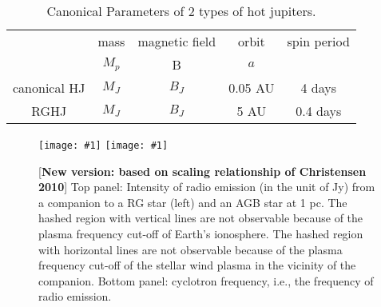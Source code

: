 \documentclass{emulateapj}
\def\memoYF#1{\color{red}$[${\bf #1}$]$ \color{black}}
\def\plotonesc#1{\centering \leavevmode
\texttt{[image: \#1]}}
\begin{document}
\begin{table}[htdp]
\caption{Canonical Parameters of 2 types of hot jupiters.}
\begin{center}
\begin{tabular}{c|cccc} \hline \hline
& mass & magnetic field & orbit &  spin period \\ 
& $M_p$ & B & $a$ &  \\ \hline
canonical HJ & $M_J$ & $B_J$ & 0.05 AU & 4 days \\
RGHJ & $M_J$ & $B_J$ & 5 AU &  0.4 days \\ \hline
\end{tabular}
\end{center}
\label{tab:comp_HJ}
\end{table}%


\begin{figure*}[bp]
   \plotonesc{radio_emission_Mdot1e-8_constRp_christensen.pdf}
   \plotonesc{radio_emission_Mdot1e-5_constRp_christensen.pdf}
   \caption{[{\bf New version: based on scaling relationship of Christensen 2010}] Top panel: Intensity of radio emission (in the unit of Jy) from a companion to a RG star (left) and an AGB star at 1 pc. The hashed region with vertical lines are not observable because of the plasma frequency cut-off of Earth's ionosphere. The hashed region with horizontal lines are not observable because of the plasma frequency cut-off of the stellar wind plasma in the vicinity of the companion. Bottom panel: cyclotron frequency, i.e., the frequency of radio emission. }
  \label{fig:radio}
\end{figure*}



\end{document}
